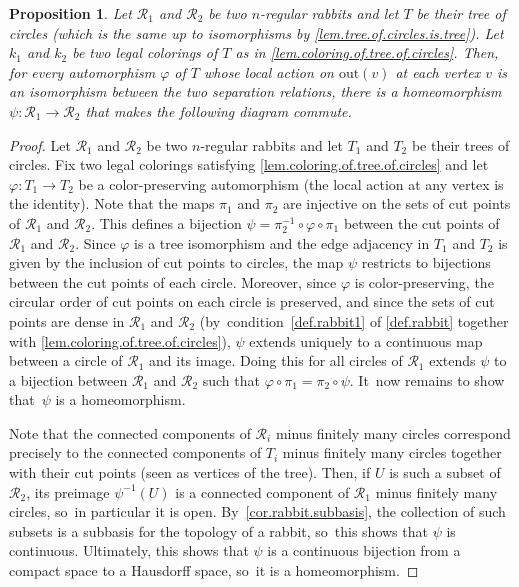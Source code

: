 \documentclass[JEP,XML,SOM,Unicode,NoFloatCountersInSection,published]{cedram}
\let\ts\textstyle
\theoremstyle{plain}
\newtheorem{proposition}[theorem]{Proposition}
\theoremstyle{definition}
\theoremstyle{remark}
\newcommand{\R}{\mathcal{R}}
\begin{document}
\begin{proposition}
\label{prop.rabbit.surjectivity}
Let $\R_1$ and $\R_2$ be two $n$-regular rabbits and let $T$ be their tree of circles (which is the same up to isomorphisms by \cref{lem.tree.of.circles.is.tree}).
Let $k_1$ and $k_2$ be two legal colorings of $T$ as in \cref{lem.coloring.of.tree.of.circles}.
Then, for every automorphism $\varphi$ of $T$ whose local action on $\mathrm{out}(v)$ at each vertex $v$ is an isomorphism between the two separation relations, there is a homeomorphism $\psi \colon \R_1 \to \R_2$ that makes the following diagram commute.\vspace*{-3pt}
\begin{center}
\end{center}
\end{proposition}

\begin{proof}
Let $\R_1$ and $\R_2$ be two $n$-regular rabbits and let $T_1$ and $T_2$ be their trees of circles.
Fix two legal colorings satisfying \cref{lem.coloring.of.tree.of.circles} and let $\varphi \colon T_1 \to T_2$ be a color-preserving automorphism (the local action at any vertex is the identity).
Note that the maps $\pi_1$ and $\pi_2$ are injective on the sets of cut points of $\R_1$ and $\R_2$.
This defines a bijection $\psi = \pi^{-1}_2 \circ \varphi \circ \pi_1$ between the cut points of $\R_1$ and $\R_2$.
Since $\varphi$ is a tree isomorphism and the edge adjacency in $T_1$ and $T_2$ is given by the inclusion of cut points to circles, the map $\psi$ restricts to bijections between the cut points of each circle.
Moreover, since $\varphi$ is color-preserving, the circular order of cut points on each circle is preserved, and since the sets of cut points are dense in $\R_1$ and $\R_2$ (by~condition~\cref{def.rabbit1} of \cref{def.rabbit} together with \cref{lem.coloring.of.tree.of.circles}), $\psi$ extends uniquely to a continuous map between a circle of $\R_1$ and its image.
Doing this for all circles of $\R_1$ extends $\psi$ to a bijection between $\R_1$ and $\R_2$ such that $\varphi \circ \pi_1 = \pi_2 \circ \psi$. It~now remains to show that~$\psi$ is a homeomorphism.

Note that the connected components of $\R_i$ minus finitely many circles correspond precisely to the connected components of $T_i$ minus finitely many circles together with their cut points (seen as vertices of the tree).
Then, if $U$ is such a subset of $\R_2$, its preimage $\psi^{-1}(U)$ is a connected component of $\R_1$ minus finitely many circles, so~in particular it is open. By~\cref{cor.rabbit.subbasis}, the collection of such subsets is a subbasis for the topology of a rabbit, so~this shows that $\psi$ is continuous.
Ultimately, this shows that $\psi$ is a continuous bijection from a compact space to a Hausdorff space, so~it is a homeomorphism.
\end{proof}
\end{document}
